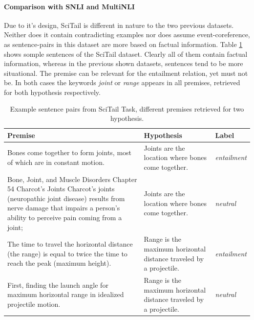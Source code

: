 \paragraph*{Comparison with \ac{SNLI} and \ac{MultiNLI}}
Due to it's design, SciTail is different in nature to the two previous datasets. Neither does it contain contradicting examples nor does assume event-coreference, as sentence-pairs in this dataset are more based on factual information. Table \ref{table:scitail_example} shows somple sentences of the SciTail dataset. Clearly all of them contain factual information, whereas in the previous shown datasets, sentences tend to be more situational. The premise can be relevant for the entailment relation, yet must not be. In both cases the keywords \textit{joint} or \textit{range} appears in all premises, retrieved for both hypothesis respectively.

\begin{table}[!htbp]
\begin{center}
\begin{tabular}{lll}
\textbf{Premise} & \textbf{Hypothesis} & \textbf{Label} \\
\toprule
\multirow{3}{*}{\parbox{9cm}{Bones come together to form joints, most of which are in constant motion.}} & \multirow{3}{*}{\parbox{5cm}{Joints are the location where bones come together.}} & \multirow{3}{*}{\parbox{2cm}{\textit{entailment}}}\\
& &  \\
& &  \\
\multirow{4}{*}{\parbox{9cm}{Bone, Joint, and Muscle Disorders Chapter 54 Charcot's Joints Charcot's joints (neuropathic joint disease) results from nerve damage that impairs a person's ability to perceive pain coming from a joint;}} & \multirow{4}{*}{\parbox{5cm}{Joints are the location where bones come together.}} & \multirow{4}{*}{\parbox{1.5cm}{\textit{neutral}}}\\ 
& &  \\
& &  \\
& &  \\
\midrule
\multirow{3}{*}{\parbox{9cm}{The time to travel the horizontal distance (the range) is equal to twice the time to reach the peak (maximum height).}} & \multirow{3}{*}{\parbox{5cm}{Range is the maximum horizontal distance traveled by a projectile.}} & \multirow{3}{*}{\parbox{1.5cm}{\textit{entailment}}}\\
& &  \\
& &  \\
\multirow{3}{*}{\parbox{9cm}{First, finding the launch angle for maximum horizontal range in idealized projectile motion.}} & \multirow{3}{*}{\parbox{5cm}{Range is the maximum horizontal distance traveled by a projectile.}} & \multirow{3}{*}{\parbox{1.5cm}{\textit{neutral}}}\\ 
& &  \\
& &  \\
\bottomrule
\end{tabular}
\caption{Example sentence pairs from SciTail Task, different premises retrieved for two hypothesis.}
\label{table:scitail_example}
\end{center}
\end{table}

